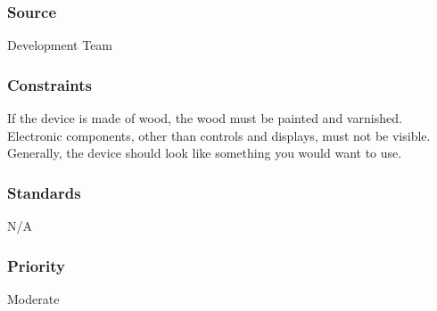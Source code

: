 \subsubsection{Source}
Development Team
\subsubsection{Constraints}
If the device is made of wood, the wood must be painted and varnished. Electronic components, other than controls and displays, must not be visible. Generally, the device should look like something you would want to use.
\subsubsection{Standards}
N/A
\subsubsection{Priority}
Moderate
